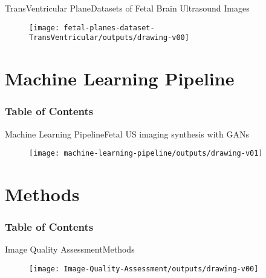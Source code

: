 {

\begin{frame}{TransVentricular Plane}{Datasets of Fetal Brain Ultrasound Images}
      \begin{figure}
        \centering
        \texttt{[image: fetal-planes-dataset-TransVentricular/outputs/drawing-v00]}
      \end{figure}
\end{frame}
}






\section{Machine Learning Pipeline}
\begin{frame}
  \frametitle{Table of Contents}
  \tableofcontents[currentsection]
\end{frame}

{
\begin{frame}{Machine Learning Pipeline}{Fetal US imaging synthesis with GANs}
      \begin{figure}
        \centering
        \texttt{[image: machine-learning-pipeline/outputs/drawing-v01]}
      \end{figure}
\end{frame}
}



\section{Methods}
\begin{frame}
  \frametitle{Table of Contents}
  \tableofcontents[currentsection]
\end{frame}


{
\begin{frame}{Image Quality Assessment}{Methods}
      \begin{figure}
        \centering
        \texttt{[image: Image-Quality-Assessment/outputs/drawing-v00]}
      \end{figure}
\end{frame}
}



